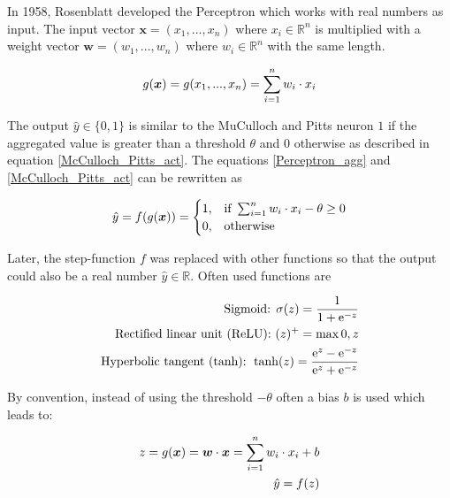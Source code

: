 In 1958, Rosenblatt  developed the Perceptron which works with real numbers as input.
The input vector \(\boldsymbol{x} = (x_1, ..., x_n)\) where \(x_i \in \mathbb{R}^n\) is multiplied with a weight vector \(\boldsymbol{w} = (w_1, ..., w_n)\) where \(w_i \in \mathbb{R}^n\) with the same length.

\begin{equation}\eqlbl{Perceptron_agg}
	g(\boldsymbol{x}) = g(x_1, ..., x_n) = \sum_{i=1}^{n} w_i \cdot x_i\\
\end{equation}

The output \(\hat{y} \in \{0, 1\}\) is similar to the MuCulloch and Pitts neuron \(1\) if the aggregated value is greater than a threshold \(\theta\) and \(0\) otherwise as described in equation \ref{McCulloch_Pitts_act}. The equations \eqref*{Perceptron_agg} and \eqref*{McCulloch_Pitts_act} can be rewritten as


\begin{equation}\eqlbl{Perceptron}
		\hat{y} =f(g(\boldsymbol{x})) = \begin{cases}
      		1, & \text{if}\ \sum_{i=1}^{n}w_i \cdot x_i - \theta \geq 0 \\
      		0, & \text{otherwise}
    	\end{cases}
\end{equation}

Later, the step-function \(f\) was replaced with other functions so that the output could also be a real number \(\hat{y} \in \mathbb{R}\). Often used functions are

\begin{equation}\eqlbl{act_functions}
	\begin{aligned}
		\text{Sigmoid: } \sigma(z) = \frac{1}{1+\mathrm{e}^{-z}}\\
		\text{Rectified linear unit (ReLU): } (z)^{+} = \max{0, z}\\
		\text{Hyperbolic tangent (tanh): } \tanh(z) = \frac{\mathrm{e}^{z}-\mathrm{e}^{-z}}{\mathrm{e}^{z}+\mathrm{e}^{-z}}
	\end{aligned}
\end{equation}

By convention, instead of using the threshold \(- \theta\) often a bias \(b\) is used which leads to:

\begin{equation}\eqlbl{nn}
	\begin{aligned}
		z = g(\boldsymbol{x}) = \boldsymbol{w} \cdot \boldsymbol{x} = \sum_{i=1}^{n}w_i \cdot x_i + b\\
		\hat{y} = f(z)
	\end{aligned}
\end{equation}

